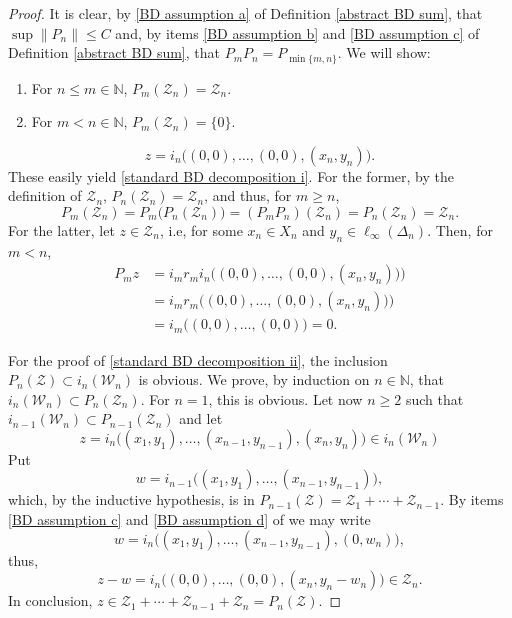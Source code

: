 \documentclass[11pt]{amsart}
\theoremstyle{definition}
\newcommand{\N}{\mathbb{N}}
\numberwithin{equation}{section}
\begin{document}
\begin{proof}
It is clear, by \cref{BD assumption a} of Definition \ref{abstract BD sum}, that $\sup\|P_n\|\leq C$ and, by items \ref{BD assumption b} and \ref{BD assumption c} of Definition \ref{abstract BD sum}, that $P_mP_n = P_{\min\{m,n\}}$. We will show:
\begin{enumerate}[label=($\mathfrak{\alph*}$)]
    \item For $n\leq m\in\N$, $P_m(\mathcal{Z}_n) = \mathcal{Z}_n$.
    \item For $m<n\in\N$, $P_m(\mathcal{Z}_n) = \{0\}$.
\end{enumerate}
\[z = i_n\big((0,0),\ldots,(0,0),(x_n,y_n)\big).\]
These easily yield \cref{standard BD decomposition i}. For the former, by the definition of $\mathcal{Z}_n$, $P_n(\mathcal{Z}_n) = \mathcal{Z}_n$, and thus, for $m\geq n$,
\[P_m(\mathcal{Z}_n) = P_m\big(P_n(\mathcal{Z}_n)\big) = (P_mP_n)(\mathcal{Z}_n) = P_n(\mathcal{Z}_n) = \mathcal{Z}_n.\]
For the latter, let $z\in\mathcal{Z}_n$, i.e, for some $x_n\in X_n$ and $y_n\in\ell_\infty(\Delta_n)$. Then, for $m<n$,
\[
\begin{split}
P_{m}z &= i_{m}r_{m} i_n\big((0,0),\ldots,(0,0),(x_n,y_n)\big)\big)\\
&= i_{m} r_{m}\big((0,0),\ldots,(0,0),(x_n,y_n)\big)\big)\\
&= i_{m}\big((0,0),\ldots,(0,0)\big) = 0.
\end{split}
\]

For the proof of \cref{standard BD decomposition ii}, the inclusion $P_n(\mathcal{Z})\subset i_n(\mathcal{W}_n)$ is obvious. We prove, by induction on $n\in\N$, that $i_n(\mathcal{W}_n)\subset P_n(\mathcal{Z}_n)$. For $n=1$, this is obvious. Let now $n\geq 2$ such that $i_{n-1}(\mathcal{W}_n) \subset P_{n-1}(\mathcal{Z}_n)$ and let
\[z = i_n\big((x_1,y_1),\ldots,(x_{n-1},y_{n-1}),(x_n,y_n)\big)\in i_n(\mathcal{W}_n)\]
Put
\[w = i_{n-1}\big((x_1,y_1),\ldots,(x_{n-1},y_{n-1})\big),\]
which, by the inductive hypothesis, is in $P_{n-1}(\mathcal{Z}) = \mathcal{Z}_1+\cdots+\mathcal{Z}_{n-1}$. By items \ref{BD assumption c} and \ref{BD assumption d} of  we may write
\[w = i_n\big((x_1,y_1),\ldots,(x_{n-1},y_{n-1}),(0,w_n)\big),\]
thus,
\[z - w = i_n\big((0,0),\ldots,(0,0),(x_n,y_n-w_n)\big)\in \mathcal{Z}_n.\]
In conclusion, $z\in \mathcal{Z}_1+\cdots+\mathcal{Z}_{n-1}+\mathcal{Z}_n = P_n(\mathcal{Z})$.
\end{proof}
\end{document}
